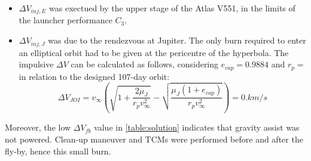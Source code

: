 \begin{itemize}
    \item $\Delta V_{inj,E}$ was exectued by the upper stage of the Atlas V551, in the limits of the launcher performance $C_3$.
    \item $\Delta V_{inj,J}$ was due to the rendezvous at Jupiter. The only burn required to enter an elliptical orbit had to be given at the pericentre of the hyperbola. The impulsive $\Delta V$ can be calculated as follows, considering $e_{cap} = 0.9884$ and $r_p = $in relation to the designed 107-day orbit: 
    \begin{equation}
        \Delta V_{JOI} = v_{\infty} \left( \sqrt{1 + \frac{2\mu_{J}}{r_p v_{\infty}^2}} - \sqrt{\frac{\mu_{J} (1 + e_{cap})}{r_p v_{\infty}^2}}\right) =  0.km/s 
    \end{equation}
\end{itemize}
Moreover, the low $\Delta V_{fb}$ value in \autoref{table:solution} indicates that gravity assist was not powered. Clean-up maneuver and TCMs were performed before and after the fly-by, hence this small burn.



